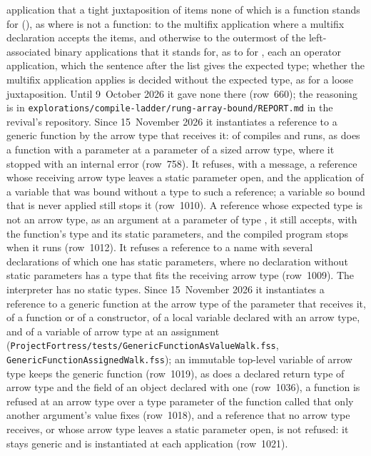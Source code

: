 \begin{description}
application that a tight juxtaposition of items none of which is a function
stands for (), as  where  is not a
function: to the multifix application where a multifix declaration accepts the
items, and otherwise to the outermost of the left-associated binary
applications that it stands for, as to  for , each
an operator application, which the sentence after the list gives the expected
type; whether the multifix application applies is decided without the expected
type, as for a loose juxtaposition.
Until 9~October 2026 it gave none there (row~660); the reasoning is in
\nolinkurl{explorations/compile-ladder/rung-array-bound/REPORT.md} in the
revival's repository.
Since 15~November 2026 it instantiates a reference to a generic function by
the arrow type that receives it:  of
 compiles and runs, as does a function with a
 parameter at a parameter of a sized arrow type, where it stopped
with an internal error (row~758).
It refuses, with a message, a reference whose receiving arrow type leaves a
static parameter open, and the application of a variable that was bound
without a type to such a reference; a variable so bound that is never applied
still stops it (row~1010).
A reference whose expected type is not an arrow type, as an argument at a
parameter of type , it still accepts, with the function's type and
its static parameters, and the compiled program stops when it runs
(row~1012).
It refuses a reference to a name with several declarations of which one has
static parameters, where no declaration without static parameters has a type
that fits the receiving arrow type (row~1009).
The interpreter has no static types.
Since 15~November 2026 it instantiates a reference to a generic function at
the arrow type of the parameter that receives it, of a function or of a
constructor, of a local variable declared with an arrow type, and of a
variable of arrow type at an assignment
(\nolinkurl{ProjectFortress/tests/GenericFunctionAsValueWalk.fss},
\nolinkurl{GenericFunctionAssignedWalk.fss}); an immutable top-level variable
of arrow type keeps the generic function (row~1019), as does a declared
return type of arrow type and the field of an object declared with one
(row~1036), a function is refused at
an arrow type over a type parameter of the function called that only another
argument's value fixes (row~1018), and a reference that no arrow type
receives, or whose arrow type leaves a static parameter open, is not refused:
it stays generic and is instantiated at each application (row~1021).

\end{description}
